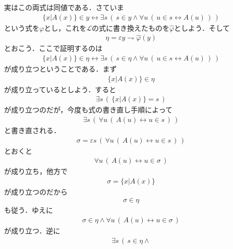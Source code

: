 \documentclass[a4j,10.5pt,oneside,openany]{jsbook}
\theoremstyle{mystyle}
\begin{document}
\begin{itemize}
			実はこの両式は同値である．さていま
			\begin{align}
				\{x|A(x)\} \in y \leftrightarrow
				\exists s\, \left(\, s \in y \wedge 
				\forall u\, \left(\, u \in s \leftrightarrow A(u)\, \right)\, \right)
			\end{align}
			という式を$\varphi$とし，これを$\mathcal{L}$の式に書き換えたものを$\hat{\varphi}$としよう．そして
			\begin{align}
				\eta = \varepsilon y \rightharpoondown \hat{\varphi}(y)
			\end{align}
			とおこう．ここで証明するのは
			\begin{align}
				\{x|A(x)\} \in \eta \leftrightarrow
				\exists s\, \left(\, s \in \eta \wedge 
				\forall u\, \left(\, u \in s \leftrightarrow A(u)\, \right)\, \right)
			\end{align}
			が成り立つということである．まず
			\begin{align}
				\{x|A(x)\} \in \eta
			\end{align}
			が成り立っているとしよう．すると
			\begin{align}
				\exists s\, \left(\, \{x|A(x)\} = s\, \right)
			\end{align}
			が成り立つのだが，今度も式の書き直し手順によって
			\begin{align}
				\exists s\, \left(\, \forall u\, \left(\, A(u) \leftrightarrow
				u \in s\, \right)\, \right)
			\end{align}
			と書き直される．
			\begin{align}
				\sigma = \varepsilon s\, \left(\, \forall u\, \left(\, A(u) \leftrightarrow
				u \in s\, \right)\, \right)
			\end{align}
			とおくと
			\begin{align}
				\forall u\, \left(\, A(u) \leftrightarrow
				u \in \sigma\, \right)
			\end{align}
			が成り立ち，他方で
			\begin{align}
				\sigma = \{x|A(x)\}
			\end{align}
			が成り立つのだから
			\begin{align}
				\sigma \in \eta
			\end{align}
			も従う．ゆえに
			\begin{align}
				\sigma \in \eta \wedge \forall u\, \left(\, A(u) \leftrightarrow
				u \in \sigma\, \right)
			\end{align}
			が成り立つ．逆に
			\begin{align}
				\exists s\, \left(\, s \in \eta \wedge 

\end{align}
\end{itemize}
\end{document}
